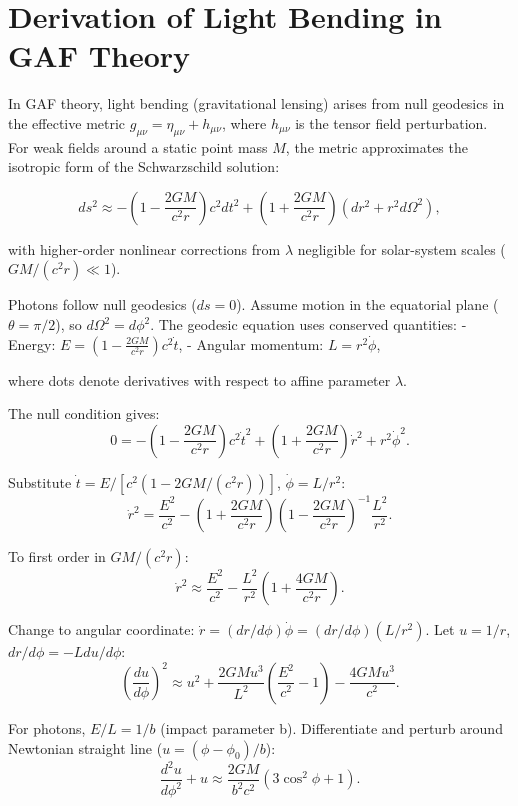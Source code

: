 \documentclass{article}
\begin{document}
\section{Derivation of Light Bending in GAF Theory}

In GAF theory, light bending (gravitational lensing) arises from null geodesics in the effective metric \( g_{\mu\nu} = \eta_{\mu\nu} + h_{\mu\nu} \), where \( h_{\mu\nu} \) is the tensor field perturbation. For weak fields around a static point mass \( M \), the metric approximates the isotropic form of the Schwarzschild solution:

\[
ds^2 \approx -\left(1 - \frac{2GM}{c^2 r}\right) c^2 dt^2 + \left(1 + \frac{2GM}{c^2 r}\right) (dr^2 + r^2 d\Omega^2),
\]

with higher-order nonlinear corrections from \( \lambda \) negligible for solar-system scales (\( GM/(c^2 r) \ll 1 \)).

Photons follow null geodesics (\( ds = 0 \)). Assume motion in the equatorial plane (\( \theta = \pi/2 \)), so \( d\Omega^2 = d\phi^2 \). The geodesic equation uses conserved quantities:
- Energy: \( E = \left(1 - \frac{2GM}{c^2 r}\right) c^2 \dot{t} \),
- Angular momentum: \( L = r^2 \dot{\phi} \),

where dots denote derivatives with respect to affine parameter \( \lambda \).

The null condition gives:
\[
0 = -\left(1 - \frac{2GM}{c^2 r}\right) c^2 \dot{t}^2 + \left(1 + \frac{2GM}{c^2 r}\right) \dot{r}^2 + r^2 \dot{\phi}^2.
\]

Substitute \( \dot{t} = E / [c^2 (1 - 2GM/(c^2 r))] \), \( \dot{\phi} = L / r^2 \):
\[
\dot{r}^2 = \frac{E^2}{c^2} - \left(1 + \frac{2GM}{c^2 r}\right) \left(1 - \frac{2GM}{c^2 r}\right)^{-1} \frac{L^2}{r^2}.
\]

To first order in \( GM/(c^2 r) \):
\[
\dot{r}^2 \approx \frac{E^2}{c^2} - \frac{L^2}{r^2} \left(1 + \frac{4GM}{c^2 r}\right).
\]

Change to angular coordinate: \( \dot{r} = (dr/d\phi) \dot{\phi} = (dr/d\phi) (L / r^2) \). Let \( u = 1/r \), \( dr/d\phi = -L du/d\phi \):
\[
\left( \frac{du}{d\phi} \right)^2 \approx u^2 + \frac{2GM u^3}{L^2} \left( \frac{E^2}{c^2} - 1 \right) - \frac{4GM u^3}{c^2}.
\]

For photons, \( E/L = 1/b \) (impact parameter b). Differentiate and perturb around Newtonian straight line (\( u = (\phi - \phi_0)/b \)):
\[
\frac{d^2 u}{d\phi^2} + u \approx \frac{2GM}{b^2 c^2} (3 \cos^2 \phi + 1).
\]
\end{document}
